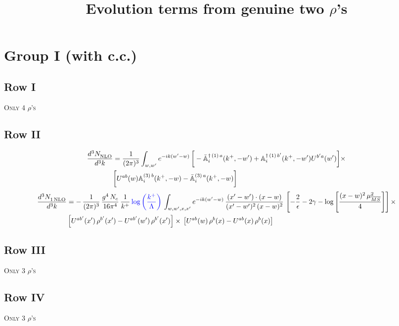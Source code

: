 \documentclass[9pt]{article}
\title{Evolution terms from genuine two $\rho$'s}
\author{}
\date{}
\def\mf#1{\mathbb{#1}}
\numberwithin{equation}{section}
\begin{document}
\maketitle
\section{Group I (with c.c.)}
\subsection{Row I}
\textsc{Only 4 $\rho$'s}
\subsection{Row II}
\begin{align}
    \frac{d^{3}N_{\rm NLO}^{\rm}}{d^{3}k} &  = \frac{1}{(2\pi)^{3}}  \int_{w, w^\prime} e^{-ik(w^\prime-w)}\,\bigg[-\bar{\mf{A}}^{\dagger\,(1)\,a}_{i}(k^{+},-w^{\prime})+\mf{A}^{\dagger\, (1)\, b^{\prime}}_{i}(k^{+},-w^{\prime})U^{b^{\prime}a}(w^{\prime})\bigg]\times \notag \\ & \bigg[U^{ab}(w)\mf{A}^{(3)\, b}_{i}(k^{+},- w)-\Bar{\mf{A}}^{(3)\, a}_{i}(k^{+}, - w)\bigg]\nonumber
\end{align}
\begin{align}
     \frac{d^{3}N_{1\,\rm NLO}^{\rm}}{d^{3}k} &  = -\,\frac{1}{(2\pi)^{3}}\, \frac{g^{4}\,N_{c}}{16\pi^{4}}\,\frac{1}{k^{+}}\,{\color{blue}\log{\left(\frac{k^{+}}{\Lambda}\right)}}\, \int_{w, w',x,x'} e^{-ik(w^\prime-w)}\, \frac{(x'-w')\cdot (x-w)}{(x'-w')^{2}\, (x-w)^{2}}\, \left[-\frac{2}{\epsilon}-2\gamma-\log{\left[\frac{(x-w)^{2}\,\mu^{2}_{\overline{MS}}}{4}\right]}\right]\times\notag \\ & \left[U^{ab'}(x')\,\rho^{b'}(x') - U^{ab'}(w')\,\rho^{b'}(x')\right]\times\,\left[U^{ab}(w)\,\rho^{b}(x) - U^{ab}(x)\,\rho^{b}(x)\right]
\end{align}
\subsection{Row III}
\textsc{Only 3 $\rho$'s}
\subsection{Row IV}
\textsc{Only 3 $\rho$'s}
\end{document}
